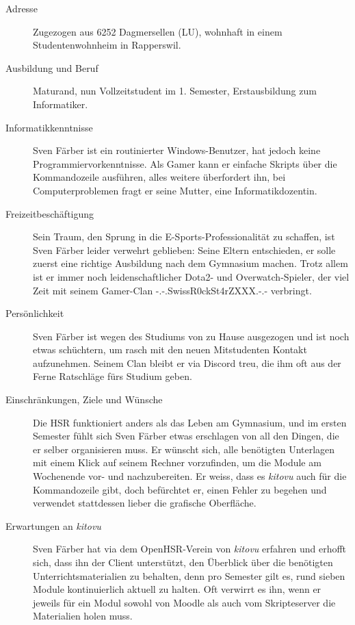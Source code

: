 \documentclass[a4paper]{article}
\begin{document}
\begin{description}
	\item[Adresse] Zugezogen aus 6252 Dagmersellen (LU), wohnhaft in einem Studentenwohnheim in Rapperswil.
	\item[Ausbildung und Beruf] Maturand, nun Vollzeitstudent im 1. Semester, Erstausbildung zum Informatiker.
	\item[Informatikkenntnisse] Sven Färber ist ein routinierter Windows-Benutzer, hat jedoch keine Programmiervorkenntnisse. Als Gamer kann er einfache Skripts über die Kommandozeile ausführen, alles weitere überfordert ihn, bei Computerproblemen fragt er seine Mutter, eine Informatikdozentin.
	\item[Freizeitbeschäftigung] Sein Traum, den Sprung in die E-Sports-Professionalität zu schaffen, ist Sven Färber leider verwehrt geblieben: Seine Eltern entschieden, er solle zuerst eine richtige Ausbildung nach dem Gymnasium machen. Trotz allem ist er immer noch leidenschaftlicher Dota2- und Overwatch-Spieler, der viel Zeit mit seinem Gamer-Clan -.-.SwissR0ckSt4rZXXX.-.- verbringt.
	\item[Persönlichkeit] Sven Färber ist wegen des Studiums von zu Hause ausgezogen und ist noch etwas schüchtern, um rasch mit den neuen Mitstudenten Kontakt aufzunehmen. Seinem Clan bleibt er via Discord treu, die ihm oft aus der Ferne Ratschläge fürs Studium geben. 
	\item[Einschränkungen, Ziele und Wünsche] Die HSR funktioniert anders als das Leben am Gymnasium, und im ersten Semester fühlt sich Sven Färber etwas erschlagen von all den Dingen, die er selber organisieren muss. Er wünscht sich, alle benötigten Unterlagen mit einem Klick auf seinem Rechner vorzufinden, um die Module am Wochenende vor- und nachzubereiten. Er weiss, dass es \emph{kitovu} auch für die Kommandozeile gibt, doch befürchtet er, einen Fehler zu begehen und verwendet stattdessen lieber die grafische Oberfläche.
	\item[Erwartungen an \emph{kitovu}] Sven Färber hat via dem OpenHSR-Verein von \emph{kitovu} erfahren und erhofft sich, dass ihn der Client unterstützt, den Überblick über die benötigten Unterrichtsmaterialien zu behalten, denn pro Semester gilt es, rund sieben Module kontinuierlich aktuell zu halten. Oft verwirrt es ihn, wenn er jeweils für ein Modul sowohl von Moodle als auch vom Skripteserver die Materialien holen muss.
\end{description}

\pagebreak
\end{document}
